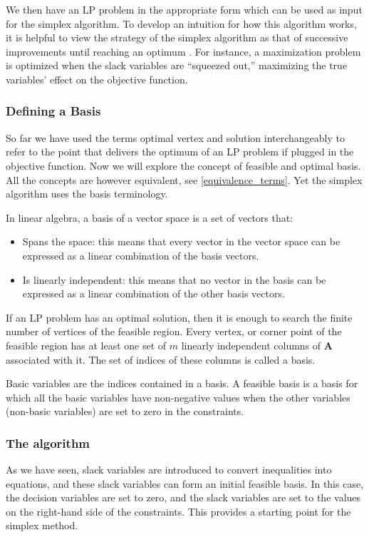 We then have an LP problem in the appropriate form which can be used as input for the simplex algorithm. To develop an intuition for how this algorithm works, it is helpful to view the strategy of the simplex algorithm as that of successive improvements until reaching an optimum \parencite{chvatal1983linear}. For instance, a maximization problem is optimized when the slack variables are “squeezed out,” maximizing the true variables’ effect on the objective function.

\subsubsection{Defining a Basis}
So far we have used the terms optimal vertex and solution interchangeably to refer
to the point that delivers the optimum of an LP problem if plugged in the objective function. Now we will explore the concept of feasible and optimal basis. All the concepts are however equivalent, see \ref{equivalence_terms}. Yet the simplex algorithm uses the basis terminology.

In linear algebra, a basis of a vector space is a set of vectors that:
\begin{itemize}
    \item Spans the space: this means that every vector in the vector space
          can be expressed as a linear combination of the basis vectors.
    \item Is linearly independent: this means that no vector in the basis can be
          expressed as a linear combination of the other basis vectors.
\end{itemize}

If an LP problem has an optimal solution, then it is enough to search the finite number of vertices of the feasible region. Every vertex, or corner point of the feasible region has at least one set of $m$ linearly independent columns of $\mathbf{A}$  associated with it. The set of indices of these columns is called a basis.

Basic variables are the indices contained in a basis. A feasible basis is a basis for which all the basic variables have non-negative values when the other variables (non-basic variables) are set to zero in the constraints.

\subsubsection{The algorithm}
As we have seen, slack variables are introduced to convert inequalities into equations, and these slack variables can form an initial feasible basis. In this case, the decision variables are set to zero, and the slack variables are set to the values on the right-hand side of the constraints. This provides a starting point for the simplex method.

